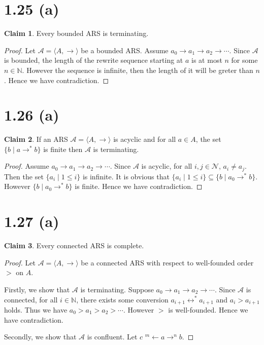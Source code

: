 \documentclass[autodetect-enginem]{article}
\title{}
\author{}
\date{}
\theoremstyle{plain}
\theoremstyle{definition}
\newtheorem*{claim*}{Claim}
\begin{document}
\section*{1.25 (a)}

\begin{claim*}
    Every bounded ARS is terminating.
\end{claim*}

\begin{proof}
    Let $\mathcal{A} = \langle A, \to \rangle$ be a bounded ARS.
    Assume $a_0 \to a_1 \to a_2 \to \cdots$.
    Since $\mathcal{A}$ is bounded, the length of the rewrite sequence starting at $a$ is at most $n$ for some $n \in \mathbb{N}$.
    However the sequence is infinite, then the length of it will be greter than $n$.
    Hence we have contradiction.    
\end{proof}

\section*{1.26 (a)}

\begin{claim*}
    If an ARS $\mathcal{A} = \langle A, \to \rangle$ is acyclic and for all $a\in A$, the set $\{b \mid a \to^* b\}$
    is finite then $\mathcal{A}$ is terminating.
\end{claim*}

\begin{proof}
    Assume $a_0 \to a_1 \to a_2 \to \cdots$.
    Since $\mathcal{A}$ is acyclic, for all $i,j \in \mathcal{N}$, $a_i \neq a_j$.
    Then the set $\{ a_i \mid 1 \leq i \}$ is infinite.
    It is obvious that $\{ a_i \mid 1 \leq i \} \subseteq \{b \mid a_0 \to^* b\}$.
    However $\{b \mid a_0 \to^* b\}$ is finite. Hence we have contradiction.
\end{proof}

\section*{1.27 (a)}

\begin{claim*}
    Every connected ARS is complete.
\end{claim*}

\begin{proof}
    Let $\mathcal{A} = \langle A, \to \rangle$ be a connected ARS with respect to well-founded order $>$ on $A$.
    
    Firstly, we show that $\mathcal{A}$ is terminating.
    Suppose $a_0 \to a_1 \to a_2 \to \cdots$.
    Since $\mathcal{A}$ is connected, for all $i \in \mathbb{N}$,
    there exists some conversion $a_{i+1} \leftrightarrow^* a_{i+1}$ and $a_i > a_{i+1}$ holds.
    Thus we have $a_0 > a_1 > a_2 > \cdots$.
    However $>$ is well-founded. Hence we have contradiction.

    Secondly, we show that $\mathcal{A}$ is confluent.
    Let $c$ $^m\!\!\leftarrow a \rightarrow^n b$.
\end{proof}
\end{document}
